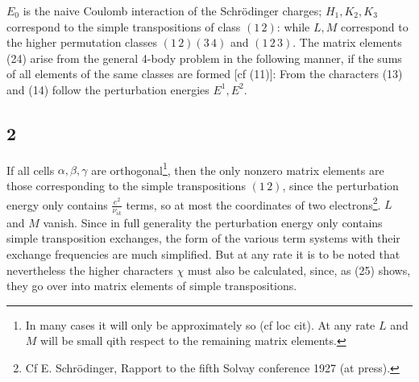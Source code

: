 \begin{paper}{1}
$E_0$ is the naive Coulomb interaction of the Schr\"odinger charges; $H_1,K_2,K_3$ correspond to the simple transpositions of class $(1\,2)$:
while $L,M$ correspond to the higher permutation classes $(1\,2)(3\,4)$ and $(1\,2\,3)$. The matrix elements (24) arise from the general 4-body problem in the following manner, if the sums of all elements of the same classes are formed [cf (11)]:
From the characters (13) and (14) follow the perturbation energies $E^1,E^2$.

\subsection*{2} If all cells $\alpha,\beta,\gamma$ are orthogonal\footnote{In many cases it will only be approximately so (cf loc cit). At any rate $L$ and $M$ will be small qith respect to the remaining matrix elements.}, then the only nonzero matrix elements are those corresponding to the simple transpositions $(1\,2)$, since the perturbation energy only contains $\frac{e^2}{\nu_{ik}}$ terms, so at most the coordinates of two electrons\footnote{Cf E. Schr\"odinger, Rapport to the fifth Solvay conference 1927 (at press).}. $L$ and $M$ vanish. Since in full generality the perturbation energy only contains simple transposition exchanges, the form of the various term systems with their exchange frequencies are much simplified. But at any rate it is to be noted that nevertheless the higher characters $\chi$ must also be calculated, since, as (25) shows, they go over into matrix elements of simple transpositions.


\end{paper}
